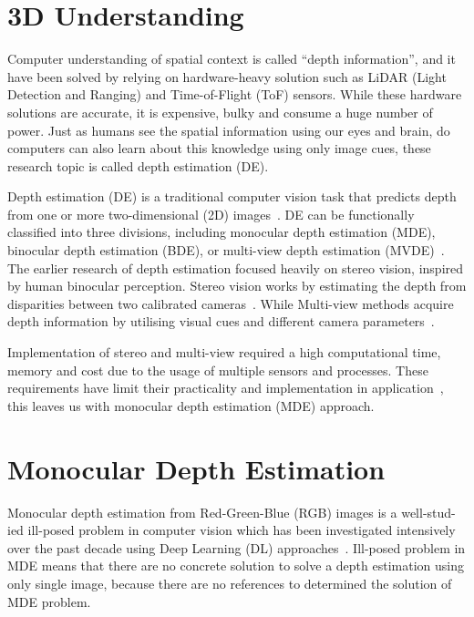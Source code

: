 \documentclass[a4paper,10pt]{article}
\begin{document}
\section{3D Understanding}

Computer understanding of spatial context is called ``depth information'', and it have been solved by relying on hardware-heavy solution such as LiDAR (Light Detection and Ranging) and Time-of-Flight (ToF) sensors.
While these hardware solutions are accurate, it is expensive, bulky and consume a huge number of power. 
Just as humans see the spatial information using our eyes and brain, do computers can also learn about this knowledge using only image cues, these research topic is called depth estimation (DE).

Depth estimation (DE) is a traditional computer vision task that predicts depth from one or more two-dimensional (2D) images~\cite{Masoumian2022MDEReview}.
DE can be functionally classified into three divisions, including monocular depth estimation (MDE), binocular depth estimation (BDE), or multi-view depth estimation (MVDE)~\cite{Masoumian2022MDEReview}.
The earlier research of depth estimation focused heavily on stereo vision, inspired by human binocular perception.
Stereo vision works by estimating the depth from disparities between two calibrated cameras~\cite{Zhang2025MDESurvey}.
While Multi-view methods acquire depth information by utilising visual cues and different camera parameters~\cite{Khan2020MDEReview}.

Implementation of stereo and multi-view required a high computational time, memory and cost due to the usage of multiple sensors and processes.
These requirements have limit their practicality and implementation in application~\cite{Khan2020MDEReview,Masoumian2022MDEReview}, this leaves us with monocular depth estimation (MDE) approach.

\section{Monocular Depth Estimation}

Monocular depth estimation from Red-Green-Blue (RGB) images is a well-stud-ied ill-posed problem in computer vision which has been investigated intensively over the past decade using Deep Learning (DL) approaches~\cite{Khan2020MDEReview}.
Ill-posed problem in MDE means that there are no concrete solution to solve a depth estimation using only single image, because there are no references to determined the solution of MDE problem.
\end{document}
